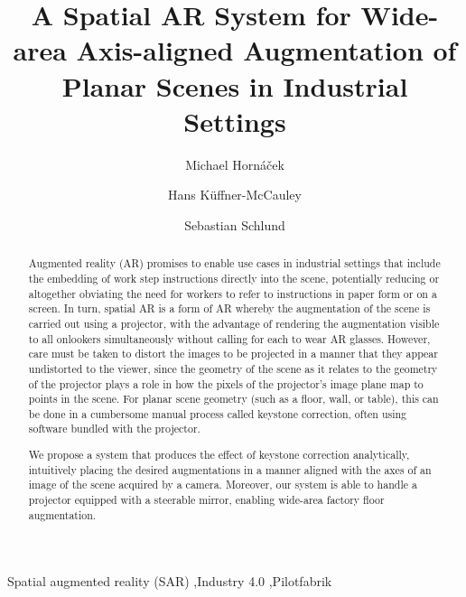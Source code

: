 \documentclass[review]{elsarticle}
\begin{document}
\begin{frontmatter}

\title{A Spatial AR System for Wide-area Axis-aligned Augmentation of Planar Scenes in Industrial Settings} %

\author{Michael Horn\'{a}\v{c}ek}
\author{Hans K\"{u}ffner-McCauley}
\author{Sebastian Schlund}
\address{Human Centered Cyber Physical Production and Assembly Systems, Institute for Management Sciences, TU Vienna, Austria}

\begin{abstract}
Augmented reality (AR) promises to enable use cases in industrial settings that include the embedding of work step instructions directly into the scene, potentially reducing or altogether obviating the need for workers to refer to instructions in paper form or on a screen. In turn, spatial AR is a form of AR whereby the augmentation of the scene is carried out using a projector, with the advantage of rendering the augmentation visible to all onlookers simultaneously without calling for each to wear AR glasses. However, care must be taken to distort the images to be projected in a manner that they appear undistorted to the viewer, since the geometry of the scene as it relates to the geometry of the projector plays a role in how the pixels of the projector's image plane map to points in the scene. For planar scene geometry (such as a floor, wall, or table), this can be done in a cumbersome manual process called keystone correction, often using software bundled with the projector.

We propose a system that produces the effect of keystone correction analytically, intuitively placing the desired augmentations in a manner aligned with the axes of an image of the scene acquired by a camera. Moreover, our system is able to handle a projector equipped with a steerable mirror, enabling wide-area factory floor augmentation.
\end{abstract}

\begin{keyword}
Spatial augmented reality (SAR) \sep Industry 4.0 \sep Pilotfabrik
\end{keyword}

\end{frontmatter}
\end{document}
